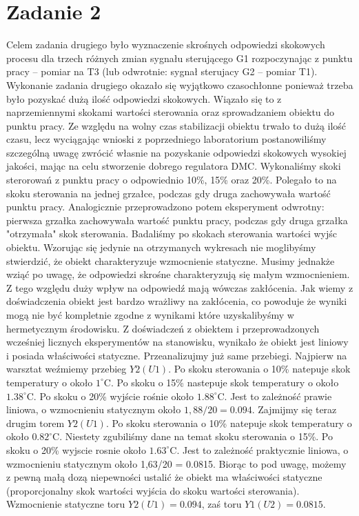 \chapter{Zadanie 2}
Celem zadania drugiego było wyznaczenie skrośnych odpowiedzi skokowych procesu dla trzech różnych zmian sygnału sterującego G1 rozpoczynając z punktu pracy – pomiar na T3 (lub odwrotnie: sygnał
sterujacy G2 – pomiar T1). Wykonanie zadania drugiego okazało się wyjątkowo czasochłonne ponieważ trzeba było pozyskać dużą ilość odpowiedzi skokowych. Wiązało się to z naprzemiennymi skokami
wartości sterowania oraz sprowadzaniem obiektu do punktu pracy. Ze względu na wolny czas stabilizacji obiektu trwało to dużą ilość czasu, lecz wyciągając wnioski z poprzedniego laboratorium
postanowiliśmy szczególną uwagę zwrócić własnie na pozyskanie odpowiedzi skokowych wysokiej jakości, mając na celu stworzenie dobrego regulatora DMC. Wykonaliśmy skoki sterorowań z punktu pracy
o odpowiednio 10\%, 15\% oraz 20\%. Polegało to na skoku sterowania na jednej grzałce, podczas gdy druga zachowywała wartość punktu pracy. Analogicznie przeprowadzono potem eksperyment odwrotny:
pierwsza grzałka zachowywała wartość punktu pracy, podczas gdy druga grzałka "otrzymała" skok sterowania. Badaliśmy po skokach sterowania wartości wyjśc obiektu. Wzorując się jedynie na
otrzymanych wykresach nie moglibyśmy stwierdzić, że obiekt charakteryzuje wzmocnienie statyczne. Musimy jednakże wziąć po uwagę, że odpowiedzi skrośne charakteryzują się
małym wzmocnieniem. Z tego względu duży wpływ na odpowiedź mają wówczas zakłócenia. Jak wiemy z doświadczenia obiekt jest bardzo wrażliwy na zakłócenia, co powoduje że wyniki
mogą nie być kompletnie zgodne z wynikami które uzyskalibyśmy w hermetycznym środowisku. Z doświadczeń z obiektem i przeprowadzonych wcześniej licznych eksperymentów na stanowisku,
wynikało że obiekt jest liniowy i posiada właściwości statyczne. Przeanalizujmy już same przebiegi. Najpierw na warsztat weźmiemy przebieg $Y2(U1)$. Po skoku sterowania o 10\%
natepuje skok temperatury o około $1^\circ$C. Po skoku o 15\% nastepuje skok temperatury o około $1.38^\circ$C. Po skoku o 20\% wyjście rośnie około $1.88^\circ$C. Jest to zależność prawie liniowa,
o wzmocnieniu statycznym około $1,88/20 = 0.094$. Zajmijmy się teraz drugim torem $Y2(U1)$. Po skoku sterowania o 10\%
natepuje skok temperatury o około $0.82^\circ$C. Niestety zgubiliśmy dane na temat skoku sterowania o 15\%. Po skoku o 20\% wyjscie rosnie około $1.63^\circ$C. Jest to zależność praktycznie
liniowa,
o wzmocnieniu statycznym około 1,63/20 = 0.0815.  Biorąc to pod uwagę, możemy z pewną małą dozą niepewności ustalić
że obiekt ma właściwości statyczne (proporcjonalny skok wartości wyjścia do skoku wartości sterowania). Wzmocnienie statyczne toru $Y2(U1) = 0.094$, zaś toru $Y1(U2) = 0.0815$.

